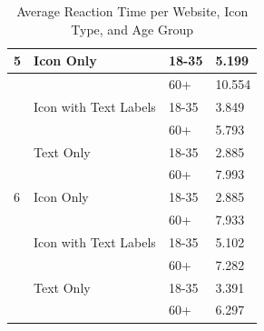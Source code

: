\documentclass[12pt,twoside]{reedthesis}
\begin{document}
\begin{table}[h!]
\begin{tabular}{| p{2cm} | p{5cm} | p{3cm} | p{3.5cm}|}
        5 & Icon Only & 18-35 & 5.199\\
        \hline
        & & 60+ & 10.554\\
        \hline
        & Icon with Text Labels & 18-35 & 3.849\\
        \hline
        && 60+ & 5.793\\
        \hline
        & Text Only & 18-35 & 2.885\\
        \hline
         && 60+ & 7.993\\
        \hline

        6 & Icon Only & 18-35 & 2.885\\
        \hline
        & & 60+ & 7.933\\
        \hline
        & Icon with Text Labels & 18-35 & 5.102\\
        \hline
        && 60+ & 7.282\\
        \hline
        & Text Only & 18-35 & 3.391\\
        \hline
         && 60+ & 6.297\\
        \hline
    \end{tabular}
    \caption{Average Reaction Time per Website, Icon Type, and Age Group}
\end{table}
\end{document}
